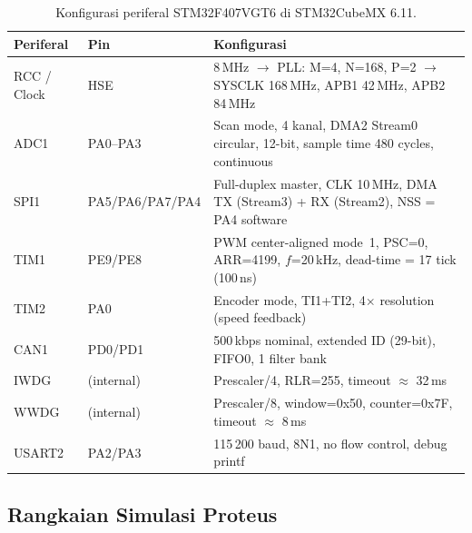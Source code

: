 \documentclass[12pt,a4paper]{article}
\begin{document}
\begin{table}[H]
\centering\small
\caption{Konfigurasi periferal STM32F407VGT6 di STM32CubeMX 6.11.}
\label{tab:cubemx}
\setlength{\tabcolsep}{5pt}
\begin{tabularx}{\textwidth}{@{} l l X @{}}
\toprule
\textbf{Periferal} & \textbf{Pin} & \textbf{Konfigurasi}\\
\midrule
RCC / Clock & HSE
  & 8\,MHz $\to$ PLL: M=4, N=168, P=2 $\to$ SYSCLK 168\,MHz,
    APB1 42\,MHz, APB2 84\,MHz\\
ADC1        & PA0--PA3
  & Scan mode, 4 kanal, DMA2 Stream0 circular,
    12-bit, sample time 480 cycles, continuous\\
SPI1        & PA5/PA6/PA7/PA4
  & Full-duplex master, CLK 10\,MHz,
    DMA TX (Stream3) + RX (Stream2), NSS = PA4 software\\
TIM1        & PE9/PE8
  & PWM center-aligned mode~1, PSC=0, ARR=4199,
    $f$=20\,kHz, dead-time = 17 tick (100\,ns)\\
TIM2        & PA0
  & Encoder mode, TI1+TI2, 4$\times$ resolution (speed feedback)\\
CAN1        & PD0/PD1
  & 500\,kbps nominal, extended ID (29-bit), FIFO0, 1 filter bank\\
IWDG        & (internal)
  & Prescaler/4, RLR=255, timeout $\approx$ 32\,ms\\
WWDG        & (internal)
  & Prescaler/8, window=0x50, counter=0x7F, timeout $\approx$ 8\,ms\\
USART2      & PA2/PA3
  & 115\,200 baud, 8N1, no flow control, debug printf\\
\bottomrule
\end{tabularx}
\end{table}

\subsection{Rangkaian Simulasi Proteus}
\end{document}
